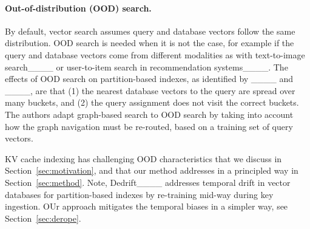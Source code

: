 \paragraph{Out-of-distribution (OOD) search.}

By default, vector search assumes query and database vectors follow the same distribution. 
OOD search is needed when it is not the case, for example if the query and database vectors come from different modalities as with text-to-image search____ or user-to-item search in recommendation systems____.
%
The effects of OOD search on partition-based indexes, as identified by ____ and ____, are that 
(1) the nearest database vectors to the query are spread over many buckets, and 
(2) the query assignment does not visit the correct buckets.
The authors adapt graph-based search to OOD search by taking into account how the graph navigation must be re-routed, based on a training set of query vectors. 

%

%
%
%

KV cache indexing has challenging OOD characteristics that we discuss in Section~\ref{sec:motivation}, and that our method \OURS addresses in a principled way in  Section~\ref{sec:method}. 
%
Note, Dedrift____ addresses temporal drift in vector databases for partition-based indexes by re-training mid-way during key ingestion. 
OUr \OURS approach mitigates the temporal biases in a simpler way, see  Section~\ref{sec:derope}.
%

%
%

%
%



%
%